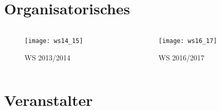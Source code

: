 \section{Organisatorisches}
\begin{frame}
    \slidehead
    \begin{columns}
        \begin{column}{6cm}
            \begin{figure}
                \centering
                \texttt{[image: ws14\_15]}
                \caption{WS 2013/2014}
            \end{figure}
        \end{column}
        \begin{column}{6cm}
            \begin{figure}
                \centering
                \texttt{[image: ws16\_17]}
                \caption{WS 2016/2017}
            \end{figure}
        \end{column}
    \end{columns}
\end{frame}

\section{Veranstalter}
